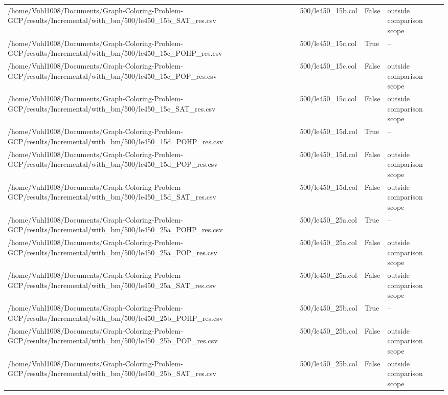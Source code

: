 \begin{table}[htbp]
\begin{tabular}{llll}
/home/Vuhl1008/Documents/Graph-Coloring-Problem-GCP/results/Incremental/with\_bm/500/le450\_15b\_SAT\_res.csv & 500/le450\_15b.col & False & outside comparison scope \\
/home/Vuhl1008/Documents/Graph-Coloring-Problem-GCP/results/Incremental/with\_bm/500/le450\_15c\_POHP\_res.csv & 500/le450\_15c.col & True & -- \\
/home/Vuhl1008/Documents/Graph-Coloring-Problem-GCP/results/Incremental/with\_bm/500/le450\_15c\_POP\_res.csv & 500/le450\_15c.col & False & outside comparison scope \\
/home/Vuhl1008/Documents/Graph-Coloring-Problem-GCP/results/Incremental/with\_bm/500/le450\_15c\_SAT\_res.csv & 500/le450\_15c.col & False & outside comparison scope \\
/home/Vuhl1008/Documents/Graph-Coloring-Problem-GCP/results/Incremental/with\_bm/500/le450\_15d\_POHP\_res.csv & 500/le450\_15d.col & True & -- \\
/home/Vuhl1008/Documents/Graph-Coloring-Problem-GCP/results/Incremental/with\_bm/500/le450\_15d\_POP\_res.csv & 500/le450\_15d.col & False & outside comparison scope \\
/home/Vuhl1008/Documents/Graph-Coloring-Problem-GCP/results/Incremental/with\_bm/500/le450\_15d\_SAT\_res.csv & 500/le450\_15d.col & False & outside comparison scope \\
/home/Vuhl1008/Documents/Graph-Coloring-Problem-GCP/results/Incremental/with\_bm/500/le450\_25a\_POHP\_res.csv & 500/le450\_25a.col & True & -- \\
/home/Vuhl1008/Documents/Graph-Coloring-Problem-GCP/results/Incremental/with\_bm/500/le450\_25a\_POP\_res.csv & 500/le450\_25a.col & False & outside comparison scope \\
/home/Vuhl1008/Documents/Graph-Coloring-Problem-GCP/results/Incremental/with\_bm/500/le450\_25a\_SAT\_res.csv & 500/le450\_25a.col & False & outside comparison scope \\
/home/Vuhl1008/Documents/Graph-Coloring-Problem-GCP/results/Incremental/with\_bm/500/le450\_25b\_POHP\_res.csv & 500/le450\_25b.col & True & -- \\
/home/Vuhl1008/Documents/Graph-Coloring-Problem-GCP/results/Incremental/with\_bm/500/le450\_25b\_POP\_res.csv & 500/le450\_25b.col & False & outside comparison scope \\
/home/Vuhl1008/Documents/Graph-Coloring-Problem-GCP/results/Incremental/with\_bm/500/le450\_25b\_SAT\_res.csv & 500/le450\_25b.col & False & outside comparison scope \\

\end{tabular}
\end{table}

